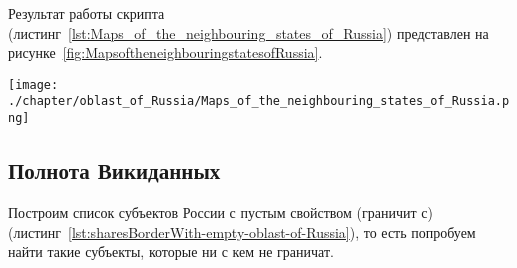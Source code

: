 Результат работы скрипта (листинг~\protect\ref{lst:Maps_of_the_neighbouring_states_of_Russia}) представлен на рисунке~\ref{fig:MapsoftheneighbouringstatesofRussia}.

\begin{fullwidth}
\begin{figure*}[h]
	\texttt{[image: ./chapter/oblast\_of\_Russia/Maps\_of\_the\_neighbouring\_states\_of\_Russia.png]}
	\caption[Карта зарубежных стран, граничащих с субъектами России, 2021.]{Карта зарубежных стран, граничащих с субъектами России, 2021. Карта построена на основе данных, полученных с помощью запроса~\protect\ref{lst:Maps_of_the_neighbouring_states_of_Russia}.}%
      \label{fig:MapsoftheneighbouringstatesofRussia}%
\end{figure*} 
\end{fullwidth}

\newpage
\subsection{Полнота Викиданных}

Построим список субъектов России с пустым свойством  (граничит с) (листинг~\protect\ref{lst:sharesBorderWith-empty-oblast-of-Russia}), то есть попробуем найти такие субъекты, которые ни с кем не граничат.

\label{question:q_subjects_of_Russia_2}

